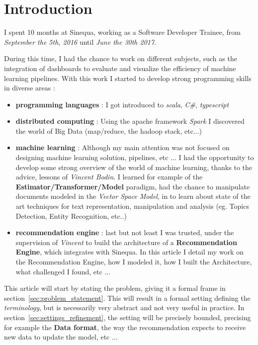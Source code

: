 \documentclass{article}
\begin{document}
\maketitle

\section{Introduction}
I spent 10 months at Sinequa, working as a Software Developer Trainee, from \textit{September the 5th, 2016} until \textit{June the 30th 2017}.

During this time, I had the chance to work on different subjects, such as the integration of  dashboards to evaluate and visualize the efficiency of machine learning pipelines. With this work I started to develop strong programming skills in diverse areas :

\begin{itemize}

\item \textbf{programming languages} : I got introduced to \textit{scala}, \textit{C\#}, \textit{typescript}
\item \textbf{distributed computing} : Using the apache framework \textit{Spark} I discovered the world of Big Data (map/reduce, the hadoop stack, etc...)
\item \textbf{machine learning} : Although my main attention was not focused on designing machine learning solution, pipelines, etc ... I had the opportunity to develop some strong overview of the world of machine learning, thanks to the advice, lessons of \textit{Vincent Bodin}. I learned for example of the \textbf{Estimator/Transformer/Model} paradigm, had the chance to manipulate documents modeled in the \textit{Vector Space Model}, in to learn about state of the art techniques for text representation, manipulation and analysis (eg. Topics Detection, Entity Recognition, etc..)
  \item \textbf{recommendation engine} : last but not least I was trusted, under the supervision of \textit{Vincent} to build the architecture of a \textbf{Recommendation Engine}, which integrates with Sinequa. In this article I detail my work on the Recommendation Engine, how I modeled it, how I built the Architecture, what challenged I found, etc ...
\end{itemize}

This article will start by stating the problem, giving it a formal frame in section~\ref{sec:problem_statement}. This will result in a formal setting defining the \textit{terminology}, but is necessarily very abstract and not very useful in practice. In section~\ref{sec:settings_refinement}, the setting will be precisely bounded, precising for example the \textbf{Data format}, the way the recommendation expects to receive new data to update the model, etc ...
\end{document}
